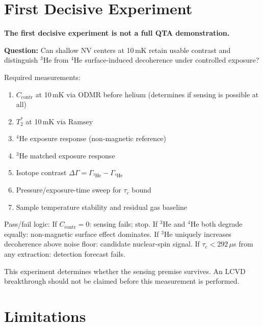 \documentclass[12pt,a4paper]{article}
\begin{document}
\section{First Decisive Experiment}
\label{sec:firstexp}

\textbf{The first decisive experiment is not a full QTA demonstration.}

\textbf{Question:} Can shallow NV centers at 10\,mK retain usable contrast
and distinguish $^3$He from $^4$He surface-induced decoherence under controlled exposure?

Required measurements:
\begin{enumerate}[noitemsep]
  \item $C_\mathrm{contr}$ at 10\,mK via ODMR before helium (determines if sensing is possible at all)
  \item $T_2^*$ at 10\,mK via Ramsey
  \item $^4$He exposure response (non-magnetic reference)
  \item $^3$He matched exposure response
  \item Isotope contrast $\Delta\Gamma = \Gamma_{^3\mathrm{He}} - \Gamma_{^4\mathrm{He}}$
  \item Pressure/exposure-time sweep for $\tau_c$ bound
  \item Sample temperature stability and residual gas baseline
\end{enumerate}

Pass/fail logic:
If $C_\mathrm{contr} = 0$: sensing fails; stop.
If $^3$He and $^4$He both degrade equally: non-magnetic surface effect dominates.
If $^3$He uniquely increases decoherence above noise floor: candidate nuclear-spin signal.
If $\tau_c < 292\,\mu$s from any extraction: detection forecast fails.

This experiment determines whether the sensing premise survives.
An LCVD breakthrough should not be claimed before this measurement is performed.

\section{Limitations}
\label{sec:limitations}
\end{document}
